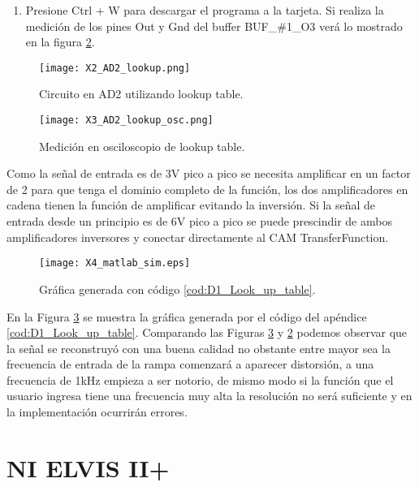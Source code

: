 \begin{enumerate}
		\item Presione Ctrl + W para descargar el programa a la tarjeta. Si realiza la medición de los pines Out y Gnd del buffer BUF\_{}\#{}1\_{}O3 verá lo mostrado en la figura \ref{fig:X3_AD2_lookup_osc}.
	\end{enumerate}
	
	\begin{figure}[!ht]
		\caption{Circuito en AD2 utilizando lookup table.}
		\label{fig:X2_AD2_lookup}
		\centering
		\texttt{[image: X2\_AD2\_lookup.png]}
	\end{figure}	
	
	\begin{figure}[!ht]
		\caption{Medición en osciloscopio de lookup table.}
		\label{fig:X3_AD2_lookup_osc}
		\centering
		\texttt{[image: X3\_AD2\_lookup\_osc.png]}
	\end{figure}

	Como la señal de entrada es de 3V pico a pico se necesita amplificar en un factor de 2 para que tenga el dominio completo de la función, los dos amplificadores en cadena tienen la función de amplificar evitando la inversión. Si la señal de entrada desde un principio es de 6V pico a pico se puede prescindir de ambos amplificadores inversores y conectar directamente al CAM TransferFunction.

	\begin{figure}[!ht]
		\caption{Gráfica generada con código \ref{cod:D1_Look_up_table}.} 
		\label{fig:X4_matlab_sim}
		\centering
		\texttt{[image: X4\_matlab\_sim.eps]}
	\end{figure}

	En la Figura \ref{fig:X4_matlab_sim} se muestra la gráfica generada por el código del apéndice \ref{cod:D1_Look_up_table}. Comparando las Figuras \ref{fig:X4_matlab_sim} y \ref{fig:X3_AD2_lookup_osc} podemos observar que la señal se reconstruyó con una buena calidad no obstante entre mayor sea la frecuencia de entrada de la rampa comenzará a aparecer distorsión, a una frecuencia de 1kHz empieza a ser notorio, de mismo modo si la función que el usuario ingresa tiene una frecuencia muy alta la resolución no será suficiente y en la implementación ocurrirán errores.
	
	
	
	
	\vspace{5cm}
	\section{NI ELVIS II+}

